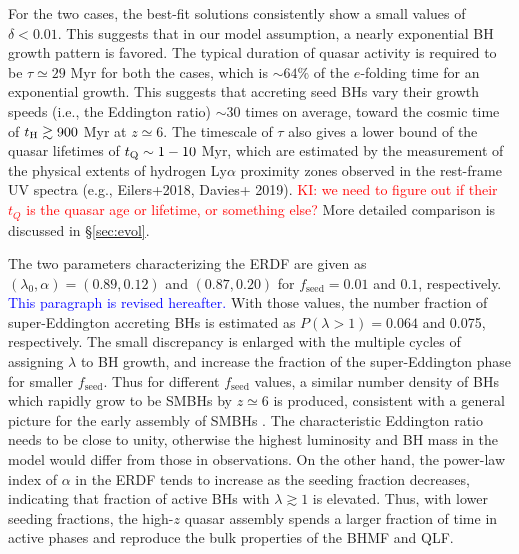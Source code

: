 \documentclass[twocolumn, twocolappendix]{aastex63}
\newcommand{\tlife}{\tau}
\newcommand{\fseed}{f_\mathrm{seed}}
\newcommand{\red}[1]{\textcolor{red}{ #1}}
\newcommand{\blue}[1]{\textcolor{blue}{ #1}}
\begin{document}
\begin{CJK*}{UTF8}{gbsn}
For the two cases, the best-fit solutions consistently show a small values of $\delta < 0.01$.
This suggests that in our model assumption, a nearly exponential BH growth pattern is favored. 
The typical duration of quasar activity is required to be $\tlife \simeq 29$ Myr for both the cases, 
which is $\sim 64\%$ of the $e$-folding time for an exponential growth.
This suggests that accreting seed BHs vary their growth speeds (i.e., the Eddington ratio) 
$\sim 30$ times on average, toward the cosmic time of $t_{\rm H}\gtrsim 900$ Myr at $z\simeq 6$.
The timescale of $\tlife$ also gives a lower bound of the quasar lifetimes of $t_{\rm Q}\sim 1-10$ Myr, 
which are estimated by the measurement of the physical extents of hydrogen Ly$\alpha$ proximity zones 
observed in the rest-frame UV spectra (e.g., Eilers+2018, Davies+ 2019).\red{KI: we need to figure out 
if their $t_Q$ is the quasar age or lifetime, or something else?}
More detailed comparison is discussed in \S\ref{sec:evol}.


The two parameters characterizing the ERDF are given as
$(\lambda_0,\alpha) = (0.89,0.12)$ and $(0.87,0.20)$ for $\fseed=0.01$ and $0.1$, respectively.
\blue{\\This paragraph is revised hereafter.}
With those values, the number fraction of super-Eddington accreting BHs is
estimated as $P(\lambda>1)=0.064$ and 0.075, respectively. 
The small discrepancy is enlarged with the multiple cycles of assigning $\lambda$ to BH growth, 
and increase the fraction of the super-Eddington phase for smaller $\fseed$. 
Thus for different $\fseed$ values, a similar number density of BHs which rapidly grow to be SMBHs by $z\simeq 6$ is produced, 
consistent with a general picture for the early assembly of SMBHs 
\citep[e.g.,][]{2006NewAR..50..665F,2008AJ....135.1057J,2010AJ....139..906W}.
The characteristic Eddington ratio needs to be close to unity, otherwise the highest luminosity and BH mass
in the model would differ from those in observations.
On the other hand, the power-law index of $\alpha$ in the ERDF tends to increase as the seeding fraction decreases,
indicating that fraction of active BHs with $\lambda \gtrsim 1$ is elevated. 
Thus, with lower seeding fractions, the high-$z$ quasar assembly spends a larger fraction of time in active phases 
and reproduce the bulk properties of the BHMF and QLF.




\end{CJK*}
\end{document}
